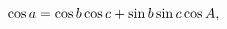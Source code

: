 \[\mathop{\cos\/}\nolimits a=\mathop{\cos\/}\nolimits b\mathop{\cos\/}\nolimits c%
+\mathop{\sin\/}\nolimits b\mathop{\sin\/}\nolimits c\mathop{\cos\/}\nolimits A,\]